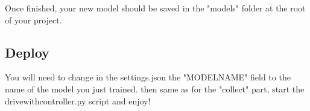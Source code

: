 \documentclass[12pt]{article}
\begin{document}
Once finished, your new model should be saved in the "models" folder at the root of your project.\\

\subsection{Deploy}
You will need to change in the settings.json the "MODEL\textunderscore NAME" field to the name of the model you just trained. then same as for the "collect" part, start the drive\textunderscore with\textunderscore controller.py script and enjoy! \\

\noindent{}\\
\end{document}
